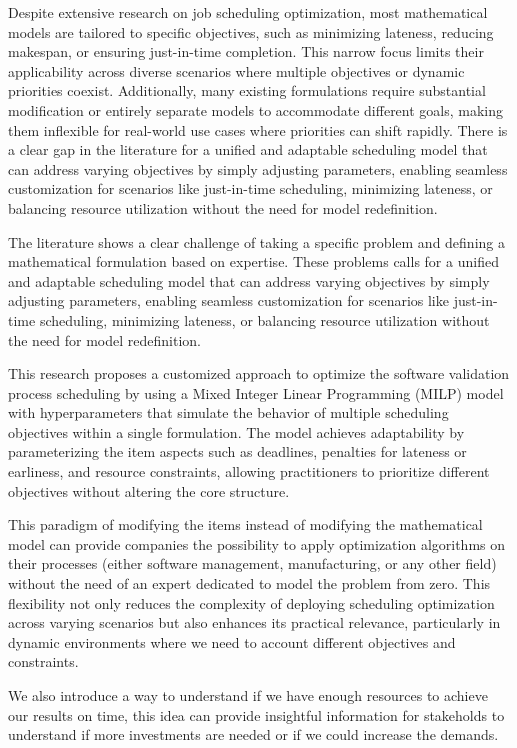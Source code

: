 \documentclass[12pt]{article}
\begin{document}
Despite extensive research on job scheduling optimization, most mathematical models are tailored to specific objectives, such as minimizing lateness, reducing makespan, or ensuring just-in-time completion. This narrow focus limits their applicability across diverse scenarios where multiple objectives or dynamic priorities coexist. Additionally, many existing formulations require substantial modification or entirely separate models to accommodate different goals, making them inflexible for real-world use cases where priorities can shift rapidly. There is a clear gap in the literature for a unified and adaptable scheduling model that can address varying objectives by simply adjusting parameters, enabling seamless customization for scenarios like just-in-time scheduling, minimizing lateness, or balancing resource utilization without the need for model redefinition.

The literature shows a clear challenge of taking a specific problem and defining a mathematical formulation based on expertise. These problems calls for a unified and adaptable scheduling model that can address varying objectives by simply adjusting parameters, enabling seamless customization for scenarios like just-in-time scheduling, minimizing lateness, or balancing resource utilization without the need for model redefinition.

This research proposes a customized approach to optimize the software validation process scheduling by using a Mixed Integer Linear Programming (MILP) model with hyperparameters that simulate the behavior of multiple scheduling objectives within a single formulation. The model achieves adaptability by parameterizing the item aspects such as deadlines, penalties for lateness or earliness, and resource constraints, allowing practitioners to prioritize different objectives without altering the core structure. 

This paradigm of modifying the items instead of modifying the mathematical model can provide companies the possibility to apply optimization algorithms on their processes (either software management, manufacturing, or any other field) without the need of an expert dedicated to model the problem from zero. This flexibility not only reduces the complexity of deploying scheduling optimization across varying scenarios but also enhances its practical relevance, particularly in dynamic environments where we need to account different objectives and constraints. 

We also introduce a way to understand if we have enough resources to achieve our results on time, this idea can provide insightful information for stakeholds to understand if more investments are needed or if we could increase the demands.
\end{document}
